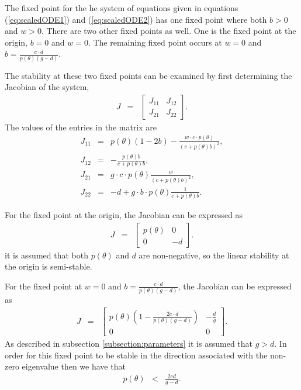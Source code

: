\documentclass[review]{elsarticle}
\begin{document}
The fixed point for the he system of equations given in equations
(\ref{eq:scaledODE1}) and (\ref{eq:scaledODE2}) has one fixed point
where both $b>0$ and $w>0$. There are two other fixed points as
well. One is the fixed point at the origin, $b=0$ and $w=0$.
The remaining fixed point occurs at $w=0$ and $b=\frac{c\cdot
  d}{p(\theta)\left(g - d\right)}$.

The stability at these two fixed points can be examined by first
determining the Jacobian of the system,
\begin{eqnarray*}
  J & = & \left[
          \begin{array}{rr}
            J_{11} & J_{12} \\
            J_{21} & J_{22}
          \end{array}
          \right].
\end{eqnarray*}
The values of the entries in the matrix are
\begin{eqnarray*}
  J_{11} & = & p(\theta)\left(1-2b\right) -
               \frac{w\cdot c \cdot p(\theta)}{\left( c + p(\theta)b \right)^2}, \\
  J_{12} & = & -\frac{p(\theta)b}{c+p(\theta)b}, \\
  J_{21} & = & g\cdot c \cdot  p(\theta) \frac{w}{\left(c+p(\theta)b\right)^2}, \\
  J_{22} & = & -d + g\cdot b \cdot  p(\theta) \frac{1}{c+p(\theta)b}.
\end{eqnarray*}

For the fixed point at the origin, the Jacobian can be expressed as 
\begin{eqnarray*}
  J & = & \left[
          \begin{array}{rr}
            p(\theta) & 0 \\
            0 & -d
          \end{array}
          \right].
\end{eqnarray*}
it is assumed that both $p(\theta)$ and $d$ are non-negative, so the
linear stability at the origin is semi-stable.

For the fixed point at $w=0$ and
$b=\frac{c\cdot d}{p(\theta)\left(g - d\right)}$, the Jacobian can be
expressed as 
\begin{eqnarray*}
  J & = & \left[
          \begin{array}{rr}
            p(\theta)\left( 1 -
            \frac{2c\cdot d}{p(\theta)(g-d)} \right) & -\frac{d}{g} \\
            0 & 0
          \end{array}
          \right].
\end{eqnarray*}
As described in subsection \ref{subsection:parameters} it is assumed
that $g>d$. In order for this fixed point to be stable in the
direction associated with the non-zero eigenvalue then we have that
\begin{eqnarray*}
  p(\theta) & < & \frac{2cd}{g-d}.
\end{eqnarray*}
\end{document}
